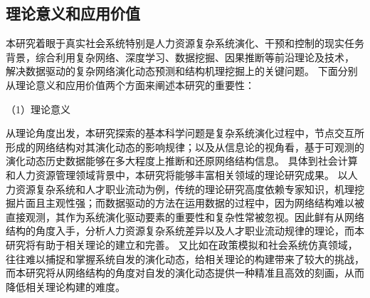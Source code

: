 

\subsection{理论意义和应用价值}

本研究着眼于真实社会系统特别是人力资源复杂系统演化、干预和控制的现实任务背景，综合利用复杂网络、深度学习、数据挖掘、因果推断等前沿理论及技术，
解决数据驱动的复杂网络演化动态预测和结构机理挖掘上的关键问题。
下面分别从理论意义和应用价值两个方面来阐述本研究的重要性：

（1）理论意义

从理论角度出发，本研究探索的基本科学问题是复杂系统演化过程中，节点交互所形成的网络结构对其演化动态的影响规律；以及从信息论的视角看，基于可观测的演化动态历史数据能够在多大程度上推断和还原网络结构信息。
具体到社会计算和人力资源管理领域背景中，本研究将能够丰富相关领域的理论研究成果。
以人力资源复杂系统和人才职业流动为例，传统的理论研究高度依赖专家知识，机理挖掘片面且主观性强；而数据驱动的方法在运用数据的过程中，因为网络结构难以被直接观测，其作为系统演化驱动要素的重要性和复杂性常被忽视。因此鲜有从网络结构的角度入手，分析人力资源复杂系统差异以及人才职业流动规律的理论，而本研究将有助于相关理论的建立和完善。
又比如在政策模拟和社会系统仿真领域，往往难以捕捉和掌握系统自发的演化动态，给相关理论的构建带来了较大的挑战，而本研究将从网络结构的角度对自发的演化动态提供一种精准且高效的刻画，从而降低相关理论构建的难度。

